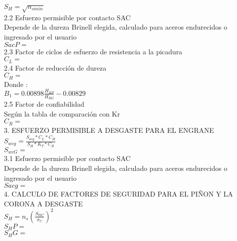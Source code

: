 \documentclass[a4paper,9pt,vertical]{article}
\begin{document}
\begin{multicols}{2}
    $S_H = \sqrt{n_{smin}}$ \\
    
    2.2	Esfuerzo permisible por contacto SAC\\
    Depende de la dureza Brinell elegida, calculado para aceros endurecidos o ingresado por el usuario\\
    
    $SacP =  $ \\
    
    2.3	Factor de ciclos de esfuerzo de resistencia a la picadura\\
   
   $ C_L=  $\\
    
    2.4	Factor de reducción de dureza\\
    $ C_H=   $\\
    
    Donde :\\
    
    $B_1=0.00898\frac{H_{BP}}{H_{BG}}-0.00829$\\
    
    2.5	 Factor de confiabilidad\\
    Según la tabla de comparación con Kr\\
    
    $C_R =  $\\
    
    
    3.	ESFUERZO PERMISIBLE A DESGASTE PARA EL ENGRANE\\
    
    $S_{wcg}=\frac{S_{acg}*C_L*C_H}{S_H*K_T*C_R}$\\
    
    $S_{wcG} =  $\\
    
    3.1	Esfuerzo permisible por contacto SAC\\
    Depende de la dureza Brinell elegida, calculado para aceros endurecidos o ingresado por el usuario\\
    
    $Sacg=   $\\
    
    4.	CALCULO DE FACTORES DE SEGURIDAD PARA EL PIÑON Y LA CORONA A DESGASTE\\
    
    $S_H=n_s (\frac{S_{WC}}{\sigma_C})^2$\\
    
    $S_HP =  $\\
    $S_HG =  $\\
    



    \end{multicols}
   
    
  
\end{document}
